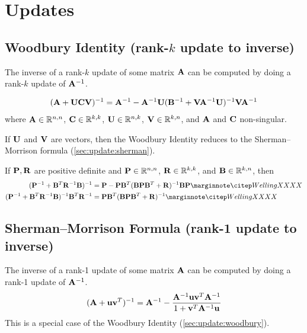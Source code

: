 \chapter{Updates}



\section{Woodbury Identity (rank-$k$ update to inverse)}
\label{sec:update:woodbury}


The inverse of a rank-$k$ update of some matrix $\mathbf{A}$ can be computed by doing a rank-$k$ update of $\mathbf{A}^{-1}$.

\begin{align}
(\mathbf{A}+\mathbf{U}\mathbf{C}\mathbf{V})^{-1} &= \mathbf{A}^{-1} - \mathbf{A}^{-1}\mathbf{U}(\mathbf{B}^{-1}+\mathbf{V}\mathbf{A}^{-1}\mathbf{U})^{-1}\mathbf{V}\mathbf{A}^{-1} \\
\end{align} %
where $\mathbf{A}\in\mathbb{R}^{n,n}$, $\mathbf{C}\in\mathbb{R}^{k,k}$, $\mathbf{U}\in\mathbb{R}^{n,k}$, $\mathbf{V}\in\mathbb{R}^{k,n}$, and $\mathbf{A}$ and $\mathbf{C}$ non-singular.

If $\mathbf{U}$ and $\mathbf{V}$ are vectors, then the Woodbury Identity reduces to the Sherman--Morrison formula (\autoref{sec:update:sherman}).

If $\mathbf{P},\mathbf{R}$ are positive definite and $\mathbf{P}\in\mathbb{R}^{n,n}$, $\mathbf{R}\in\mathbb{R}^{k,k}$, and $\mathbf{B}\in\mathbb{R}^{k,n}$, then
\begin{align}
(\mPi + \mB^T\mRi\mB)^{-1} &= \mP - \mP\mB^T(\mB\mP\mB^T+\mR)^{-1}\mB\mP  \eqcite{WellingXXXX} \\
(\mPi + \mB^T\mRi\mB)^{-1} \mB^T\mRi &= \mP\mB^T(\mB\mP\mB^T+\mR)^{-1}    \eqcite{WellingXXXX}
\end{align}

\section{Sherman--Morrison Formula (rank-1 update to inverse)}
\label{sec:update:sherman}
The inverse of a rank-1 update of some matrix $\mathbf{A}$ can be computed by doing a rank-1 update of $\mathbf{A}^{-1}$.
\begin{equation}
(\mathbf{A} + \mathbf{u}\mathbf{v}^T)^{-1}=\mathbf{A}^{-1}-\frac{\mathbf{A}^{-1}\mathbf{u}\mathbf{v}^T\mathbf{A}^{-1}}{1+\mathbf{v}^T\mathbf{A}^{-1}\mathbf{u}}
\end{equation}
This is a special case of the Woodbury Identity (\autoref{sec:update:woodbury}).



